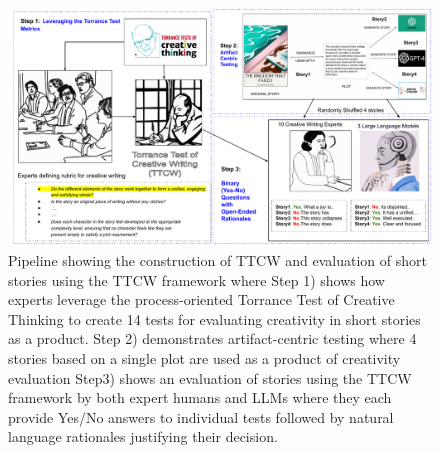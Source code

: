 \begin{figure}
\centering
\includegraphics[width=\textwidth]{figures/CHI_pipeline.pdf}
\caption{\label{pipeline}Pipeline showing the construction of TTCW and evaluation of short stories using the TTCW framework where Step 1) shows how experts leverage the process-oriented Torrance Test of Creative Thinking to create 14 tests for evaluating creativity in short stories as a product. Step 2) demonstrates artifact-centric testing where 4 stories based on a single plot are used as a product of creativity evaluation Step3) shows an evaluation of stories using the TTCW framework by both expert humans and LLMs where they each provide Yes/No answers to individual tests followed by natural language rationales justifying their decision.}
\end{figure}

